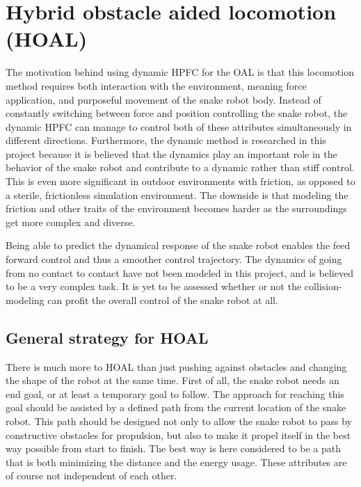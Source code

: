 \section{Hybrid obstacle aided locomotion (HOAL)}\label{sec:dhpfc-oal}

The motivation behind using dynamic HPFC for the OAL is that this locomotion method requires both interaction with the environment, meaning force application, and purposeful movement of the snake robot body. Instead of constantly switching between force and position controlling the snake robot, the dynamic HPFC can manage to control both of these attributes simultaneously in different directions. Furthermore, the dynamic method is researched in this project because it is believed that the dynamics play an important role in the behavior of the snake robot and contribute to a dynamic rather than stiff control. This is even more significant in outdoor environments with friction, as opposed to a sterile, frictionless simulation environment. The downside is that modeling the friction and other traits of the environment becomes harder as the surroundings get more complex and diverse.

Being able to predict the dynamical response of the snake robot enables the feed forward control and thus a smoother control trajectory. 
The dynamics of going from no contact to contact have not been modeled in this project, and is believed to be a very complex task. It is yet to be assessed whether or not the collision-modeling can profit the overall control of the snake robot at all.

\subsection{General strategy for HOAL}

There is much more to HOAL than just pushing against obstacles and changing the shape of the robot at the same time. First of all, the snake robot needs an end goal, or at least a temporary goal to follow. The approach for reaching this goal should be assisted by a defined path from the current location of the snake robot. This path should be designed not only to allow the snake robot to pass by constructive obstacles for propulsion, but also to make it propel itself in the best way possible from start to finish. The best way is here considered to be a path that is both minimizing the distance and the energy usage. These attributes are of course not independent of each other.

